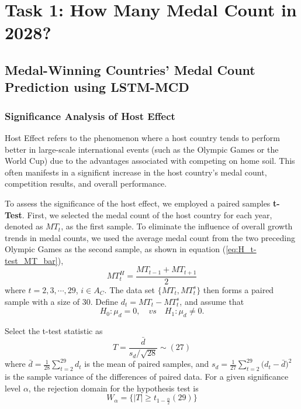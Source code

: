 \documentclass{mcmthesis}
\begin{document}
	\section{Task 1: How Many Medal Count in 2028? }
	\subsection{Medal-Winning Countries' Medal Count Prediction using LSTM-MCD}
	
	\subsubsection{Significance Analysis of Host Effect}
	
Host Effect refers to the phenomenon where a host country tends to perform better in large-scale international events (such as the Olympic Games or the World Cup) due to the advantages associated with competing on home soil. This often manifests in a significnt increase in the host country's medal count, competition results, and overall performance.

	To assess the significance of the host effect, we employed a paired samples  \textbf{t-Test}. First, we selected the medal count of the host country for each year, denoted as $MT_{t}$, as the first sample. To eliminate the influence of overall growth trends in medal counts, we used the average medal count from the two preceding Olympic Games as the second sample, as shown in equation (\ref{eq:H_t-test_MT_bar}),
	\begin{equation}
		MT^H_{t}=\frac{ MT_{t-1} + MT_{t+1} }{2}
		\label{eq:H_t-test_MT_bar}
	\end{equation}
	where $t=2,3,\cdots,29$, $i\in A_{C}$. 
	The data set $\{MT_{t},MT^s_{t}\}$ then forms a paired sample with a size of 30. 
	Define $d_t= MT_{t} - MT^s_{t}$, and assume that
	\begin{equation*}
		H_0: \mu_d=0, \quad vs \quad H_1:  \mu_d \ne 0.
	\end{equation*}
	
	Select the t-test statistic as
	\begin{equation*}
		T=\frac{ \bar{d} }{ s_d\slash \sqrt{28} } \sim (27)
	\end{equation*}
	where $\bar{d}=\frac{1}{28} \sum_{t=2}^{29} d_t$ is the mean of paired samples, 
	and $ s_d = \frac{1}{27} \sum_{t=2}^{29}\big( d_t - \bar{d} \big)^2 $ is the sample variance of the differences of paired data. 
	For a given significance level $\alpha$, the rejection domain for the hypothesis test is
	\begin{equation*}
		W_\alpha = \big\{ |T| \ge t_{1-\frac{\alpha}{2}}(29) \big\}
	\end{equation*}
	
\end{document}
